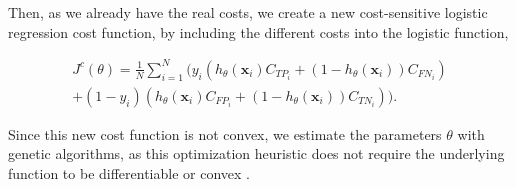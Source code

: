 Then, as we already have the real costs, we create a new cost-sensitive logistic regression cost 
function, by including the different costs into the logistic function,

\newpage
\begin{align}\label{eq:CSLR}
  J^c(\theta)=\frac{1}{N} \sum_{i=1}^{N} \bigg( y_i(h_\theta(\mathbf{x}_i) C_{TP_i} + 
  (1-h_\theta(\mathbf{x}_i))C_{FN_i})  \nonumber\\ 
  +(1-y_i)(h_\theta(\mathbf{x}_i) C_{FP_i} + (1-h_\theta(\mathbf{x}_i))C_{TN_i}) \bigg).
\end{align}

Since this  new cost function is not convex, we estimate the parameters $\theta$ with genetic 
algorithms, as this optimization heuristic does not require the underlying function to be 
differentiable or convex \citep{Haupt2004}. 

